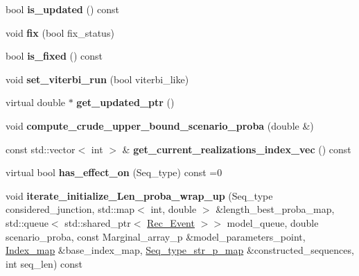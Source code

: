 \begin{DoxyCompactItemize}
\mbox{\label{classRec__Event_a191288063285122d7ce0bca6347bb469}} 
bool {\bfseries is\+\_\+updated} () const
\item 
\mbox{\label{classRec__Event_a1bd0021e7474ce38b0ff128a54e17634}} 
void {\bfseries fix} (bool fix\+\_\+status)
\item 
\mbox{\label{classRec__Event_a97f8b79a1d651b577ebebb8343dd0e4f}} 
bool {\bfseries is\+\_\+fixed} () const
\item 
\mbox{\label{classRec__Event_ad5c903886cabd9b5099ce3f9fca75721}} 
void {\bfseries set\+\_\+viterbi\+\_\+run} (bool viterbi\+\_\+like)
\item 
\mbox{\label{classRec__Event_aff100a79e69ebcf09302c9a6dd95e945}} 
virtual double $\ast$ {\bfseries get\+\_\+updated\+\_\+ptr} ()
\item 
\mbox{\label{classRec__Event_a0048d764ba437539343d7e5c7a3ab4bc}} 
void {\bfseries compute\+\_\+crude\+\_\+upper\+\_\+bound\+\_\+scenario\+\_\+proba} (double \&)
\item 
\mbox{\label{classRec__Event_aa99c6c645054931943d9efe514684378}} 
const std\+::vector$<$ int $>$ \& {\bfseries get\+\_\+current\+\_\+realizations\+\_\+index\+\_\+vec} () const
\item 
\mbox{\label{classRec__Event_ae241781e2135e31568bcd795af58588e}} 
virtual bool {\bfseries has\+\_\+effect\+\_\+on} (Seq\+\_\+type) const =0
\item 
\mbox{\label{classRec__Event_a12142d5ac5b5a0b19fe1bc32619247c9}} 
void {\bfseries iterate\+\_\+initialize\+\_\+\+Len\+\_\+proba\+\_\+wrap\+\_\+up} (Seq\+\_\+type considered\+\_\+junction, std\+::map$<$ int, double $>$ \&length\+\_\+best\+\_\+proba\+\_\+map, std\+::queue$<$ std\+::shared\+\_\+ptr$<$ \hyperlink{classRec__Event}{Rec\+\_\+\+Event} $>$$>$ model\+\_\+queue, double scenario\+\_\+proba, const Marginal\+\_\+array\+\_\+p \&model\+\_\+parameters\+\_\+point, \hyperlink{classEnum__fast__memory__map}{Index\+\_\+map} \&base\+\_\+index\+\_\+map, \hyperlink{classEnum__fast__memory__map}{Seq\+\_\+type\+\_\+str\+\_\+p\+\_\+map} \&constructed\+\_\+sequences, int seq\+\_\+len) const
$$
\end{DoxyCompactItemize}
